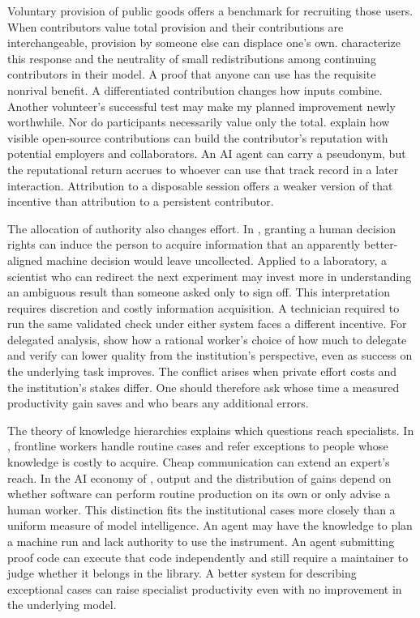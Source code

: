 \documentclass[11pt,letterpaper]{article}
\begin{document}
Voluntary provision of public goods offers a benchmark for recruiting those users. When contributors value total provision and their contributions are interchangeable, provision by someone else can displace one's own. \citet{bergstrom} characterize this response and the neutrality of small redistributions among continuing contributors in their model. A proof that anyone can use has the requisite nonrival benefit. A differentiated contribution changes how inputs combine. Another volunteer's successful test may make my planned improvement newly worthwhile. Nor do participants necessarily value only the total. \citet{lerner} explain how visible open-source contributions can build the contributor's reputation with potential employers and collaborators. An AI agent can carry a pseudonym, but the reputational return accrues to whoever can use that track record in a later interaction. Attribution to a disposable session offers a weaker version of that incentive than attribution to a persistent contributor.

The allocation of authority also changes effort. In \citet{athey}, granting a human decision rights can induce the person to acquire information that an apparently better-aligned machine decision would leave uncollected. Applied to a laboratory, a scientist who can redirect the next experiment may invest more in understanding an ambiguous result than someone asked only to sign off. This interpretation requires discretion and costly information acquisition. A technician required to run the same validated check under either system faces a different incentive. For delegated analysis, \citet{huang} show how a rational worker's choice of how much to delegate and verify can lower quality from the institution's perspective, even as success on the underlying task improves. The conflict arises when private effort costs and the institution's stakes differ. One should therefore ask whose time a measured productivity gain saves and who bears any additional errors.

The theory of knowledge hierarchies explains which questions reach specialists. In \citet{garicano}, frontline workers handle routine cases and refer exceptions to people whose knowledge is costly to acquire. Cheap communication can extend an expert's reach. In the AI economy of \citet{ide}, output and the distribution of gains depend on whether software can perform routine production on its own or only advise a human worker. This distinction fits the institutional cases more closely than a uniform measure of model intelligence. An agent may have the knowledge to plan a machine run and lack authority to use the instrument. An agent submitting proof code can execute that code independently and still require a maintainer to judge whether it belongs in the library. A better system for describing exceptional cases can raise specialist productivity even with no improvement in the underlying model.
\end{document}
